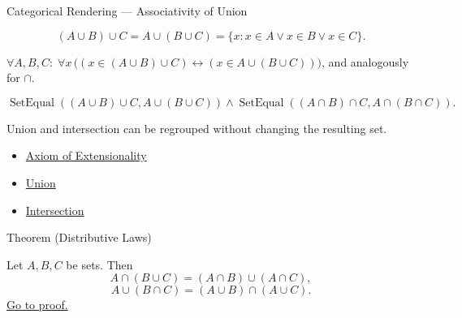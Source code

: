 \begin{lracategoricalcard}{Categorical Rendering --- Associativity of Union}
\begin{center}

\end{center}
\[
  (A\cup B)\cup C
  =
  A\cup(B\cup C)
  =
  \{x:x\in A\lor x\in B\lor x\in C\}.
\]
\end{lracategoricalcard}

\begin{remark*}
$\forall A, B, C:\; \forall x\,\bigl((x \in (A \cup B) \cup C) \leftrightarrow (x \in A \cup (B \cup C))\bigr)$, and analogously for $\cap$.
\end{remark*}

\begin{remark*}
\[
  \operatorname{SetEqual}((A\cup B)\cup C,A\cup(B\cup C))
  \wedge
  \operatorname{SetEqual}((A\cap B)\cap C,A\cap(B\cap C)).
\]
\end{remark*}

\begin{remark*}[Interpretation]
Union and intersection can be regrouped without changing the resulting set.
\end{remark*}


\begin{dependencies}
\begin{itemize}
  \item \hyperref[ax:extensionality]{Axiom of Extensionality}
  \item \hyperref[def:union]{Union}
  \item \hyperref[def:intersection]{Intersection}
\end{itemize}
\end{dependencies}

\begin{theorembox}{Theorem (Distributive Laws)}
\begin{theorem}\label{thm:distributivity}
Let $A,B,C$ be sets. Then
\[
A \cap (B \cup C) = (A \cap B) \cup (A \cap C),
\]
\[
A \cup (B \cap C) = (A \cup B) \cap (A \cup C).
\]
\hyperref[prf:distributivity]{Go to proof.}
\end{theorem}
\end{theorembox}

